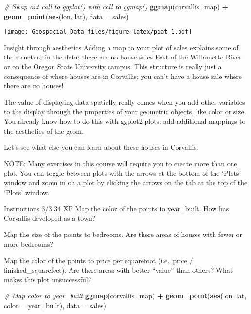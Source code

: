 \documentclass[]{article}
\newenvironment{Shaded}{\begin{snugshade}}{\end{snugshade}}
\newcommand{\CommentTok}[1]{\textcolor[rgb]{0.56,0.35,0.01}{\textit{#1}}}
\newcommand{\DataTypeTok}[1]{\textcolor[rgb]{0.13,0.29,0.53}{#1}}
\newcommand{\KeywordTok}[1]{\textcolor[rgb]{0.13,0.29,0.53}{\textbf{#1}}}
\newcommand{\NormalTok}[1]{#1}
\newcommand{\OperatorTok}[1]{\textcolor[rgb]{0.81,0.36,0.00}{\textbf{#1}}}
\newcommand{\StringTok}[1]{\textcolor[rgb]{0.31,0.60,0.02}{#1}}
\begin{document}
\begin{Shaded}
\begin{Highlighting}[]
\CommentTok{# Swap out call to ggplot() with call to ggmap()}
\KeywordTok{ggmap}\NormalTok{(corvallis_map) }\OperatorTok{+}
\StringTok{  }\KeywordTok{geom_point}\NormalTok{(}\KeywordTok{aes}\NormalTok{(lon, lat), }\DataTypeTok{data =}\NormalTok{ sales)}
\end{Highlighting}
\end{Shaded}

\texttt{[image: Geospacial-Data\_files/figure-latex/piat-1.pdf]}

Insight through aesthetics Adding a map to your plot of sales explains
some of the structure in the data: there are no house sales East of the
Willamette River or on the Oregon State University campus. This
structure is really just a consequence of where houses are in Corvallis;
you can't have a house sale where there are no houses!

The value of displaying data spatially really comes when you add other
variables to the display through the properties of your geometric
objects, like color or size. You already know how to do this with
ggplot2 plots: add additional mappings to the aesthetics of the geom.

Let's see what else you can learn about these houses in Corvallis.

NOTE: Many exercises in this course will require you to create more than
one plot. You can toggle between plots with the arrows at the bottom of
the `Plots' window and zoom in on a plot by clicking the arrows on the
tab at the top of the `Plots' window.

Instructions 3/3 34 XP Map the color of the points to year\_built. How
has Corvallis developed as a town?

Map the size of the points to bedrooms. Are there areas of houses with
fewer or more bedrooms?

Map the color of the points to price per squarefoot (i.e.~price /
finished\_squarefeet). Are there areas with better ``value'' than
others? What makes this plot unsuccessful?

\begin{Shaded}
\begin{Highlighting}[]
\CommentTok{# Map color to year_built}
\KeywordTok{ggmap}\NormalTok{(corvallis_map) }\OperatorTok{+}
\StringTok{    }\KeywordTok{geom_point}\NormalTok{(}\KeywordTok{aes}\NormalTok{(lon, lat, }\DataTypeTok{color =}\NormalTok{ year_built), }\DataTypeTok{data =}\NormalTok{ sales)}
\end{Highlighting}
\end{Shaded}
\end{document}

